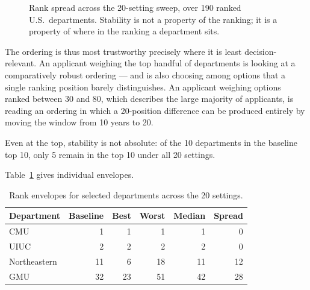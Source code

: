 \documentclass[11pt]{article}
\begin{document}
\begin{figure}[t]
\centering
{}
\hfill
{}
\caption{Rank spread across the 20-setting sweep, over 190 ranked U.S.\
departments. Stability is not a property of the ranking; it is a property of
where in the ranking a department sits.}
\label{fig:stability}
\end{figure}

The ordering is thus most trustworthy precisely where it is least decision-
relevant. An applicant weighing the top handful of departments is looking at a
comparatively robust ordering --- and is also choosing among options that a
single ranking position barely distinguishes. An applicant weighing options
ranked between 30 and 80, which describes the large majority of applicants, is
reading an ordering in which a 20-position difference can be produced entirely
by moving the window from 10 years to 20.

Even at the top, stability is not absolute: of the 10 departments in the
baseline top 10, only 5 remain in the top 10 under all 20 settings.

Table~\ref{tab:examples} gives individual envelopes.

\begin{table}[t]
\centering
\caption{Rank envelopes for selected departments across the 20 settings.}
\label{tab:examples}
\begin{tabular}{lrrrrr}
\toprule
Department & Baseline & Best & Worst & Median & Spread \\
\midrule
CMU          & 1  & 1  & 1  & 1  & 0 \\
UIUC         & 2  & 2  & 2  & 2  & 0 \\
Northeastern & 11 & 6  & 18 & 11 & 12 \\
GMU          & 32 & 23 & 51 & 42 & 28 \\
\bottomrule
\end{tabular}
\end{table}
\end{document}
